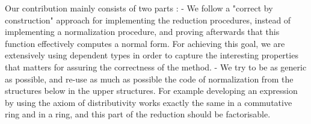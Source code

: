 Our contribution mainly consists of two parts :
	- We follow a "correct by construction" approach for implementing the reduction procedures, instead of implementing a normalization procedure, and proving afterwards that this function effectively computes a normal form. For achieving this goal, we are extensively using dependent types in order to capture the interesting properties that matters for assuring the correctness of the method. 
	- We try to be as generic as possible, and re-use as much as possible the code of normalization from the structures below in the upper structures. For example developing an expression by using the axiom of distributivity works exactly the same in a commutative ring and in a ring, and this part of the reduction should be factorisable.